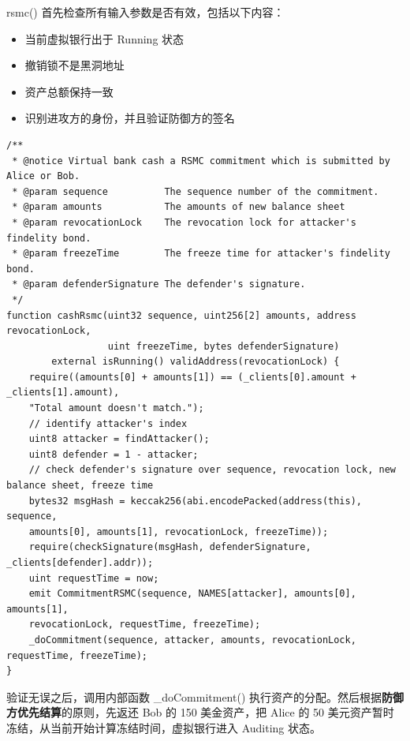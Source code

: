 \begin{appendices}
rsmc() 首先检查所有输入参数是否有效，包括以下内容：

\begin{itemize}
    \item 当前虚拟银行出于 Running 状态
    \item 撤销锁不是黑洞地址
    \item 资产总额保持一致
    \item 识别进攻方的身份，并且验证防御方的签名
\end{itemize}

\begin{lstlisting}[caption={兑现RSMC共同承诺}, label={lst:cashRsmc}]
/**
 * @notice Virtual bank cash a RSMC commitment which is submitted by Alice or Bob.
 * @param sequence          The sequence number of the commitment.
 * @param amounts           The amounts of new balance sheet
 * @param revocationLock    The revocation lock for attacker's findelity bond.
 * @param freezeTime        The freeze time for attacker's findelity bond.
 * @param defenderSignature The defender's signature.
 */
function cashRsmc(uint32 sequence, uint256[2] amounts, address revocationLock, 
                  uint freezeTime, bytes defenderSignature) 
        external isRunning() validAddress(revocationLock) {
    require((amounts[0] + amounts[1]) == (_clients[0].amount + _clients[1].amount), 
    "Total amount doesn't match.");
    // identify attacker's index
    uint8 attacker = findAttacker();
    uint8 defender = 1 - attacker;
    // check defender's signature over sequence, revocation lock, new balance sheet, freeze time
    bytes32 msgHash = keccak256(abi.encodePacked(address(this), sequence, 
    amounts[0], amounts[1], revocationLock, freezeTime));
    require(checkSignature(msgHash, defenderSignature, _clients[defender].addr));
    uint requestTime = now;
    emit CommitmentRSMC(sequence, NAMES[attacker], amounts[0], amounts[1], 
    revocationLock, requestTime, freezeTime);
    _doCommitment(sequence, attacker, amounts, revocationLock, requestTime, freezeTime);
}
\end{lstlisting}

验证无误之后，调用内部函数 \_doCommitment() 执行资产的分配。然后根据\textbf{防御方优先结算}的原则，先返还 Bob 的 150 美金资产，把 Alice 的 50 美元资产暂时冻结，从当前开始计算冻结时间，虚拟银行进入 Auditing 状态。


\end{appendices}
